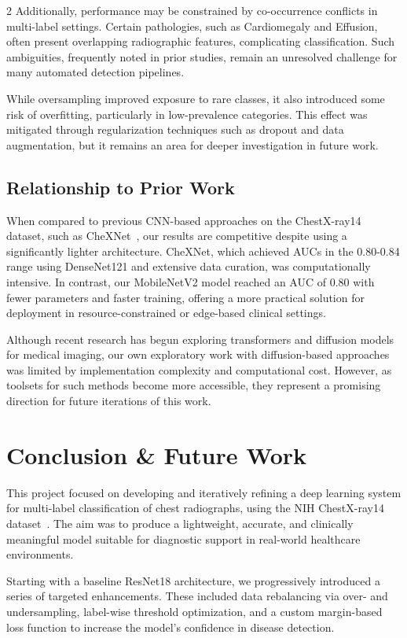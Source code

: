 \documentclass[12pt]{article}
\begin{document}
\begin{multicols}{2}
Additionally, performance may be constrained by co-occurrence conflicts in multi-label settings. Certain pathologies, such as Cardiomegaly and Effusion, often present overlapping radiographic features, complicating classification. Such ambiguities, frequently noted in prior studies, remain an unresolved challenge for many automated detection pipelines.

While oversampling improved exposure to rare classes, it also introduced some risk of overfitting, particularly in low-prevalence categories. This effect was mitigated through regularization techniques such as dropout and data augmentation, but it remains an area for deeper investigation in future work.

\subsection{Relationship to Prior Work}
When compared to previous CNN-based approaches on the ChestX-ray14 dataset, such as CheXNet~\cite{irvin2019chexpert}, our results are competitive despite using a significantly lighter architecture. CheXNet, which achieved AUCs in the 0.80-0.84 range using DenseNet121 and extensive data curation, was computationally intensive. In contrast, our MobileNetV2 model reached an AUC of 0.80 with fewer parameters and faster training, offering a more practical solution for deployment in resource-constrained or edge-based clinical settings.

Although recent research has begun exploring transformers and diffusion models for medical imaging, our own exploratory work with diffusion-based approaches was limited by implementation complexity and computational cost. However, as toolsets for such methods become more accessible, they represent a promising direction for future iterations of this work.


\section{Conclusion \& Future Work}

This project focused on developing and iteratively refining a deep learning system for multi-label classification of chest radiographs, using the NIH ChestX-ray14 dataset~\cite{wang2017chestx}. The aim was to produce a lightweight, accurate, and clinically meaningful model suitable for diagnostic support in real-world healthcare environments.

Starting with a baseline ResNet18 architecture, we progressively introduced a series of targeted enhancements. These included data rebalancing via over- and undersampling, label-wise threshold optimization, and a custom margin-based loss function to increase the model's confidence in disease detection.


\end{multicols}
\end{document}
